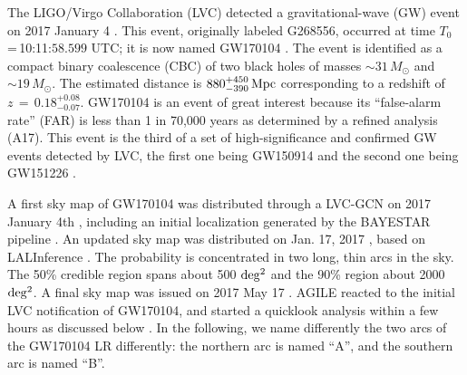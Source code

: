 \documentclass[preprint2]{aastex}
\def\gwt {G268556}
\def\gw {GW170104 }
\def\gwp {GW170104}
\def \fv {}
\begin{document}
The LIGO/Virgo Collaboration  (LVC) detected a
gravitational-wave (GW) event on  2017 January 4 \cite[][]{2017GCN..20364...1S,2017GCN..21056...1B,2017GCN..20385...1G}.
 This event, originally labeled \gwt, occurred at time
$T_0$\,=\,10:11:$58.599$ UTC; it is now named  \gw \cite[][ hereafter A17]{2017PhRvLsub}.
The event is identified
as a compact binary coalescence (CBC) of two black holes of masses
$ \sim 31 \, M_{\odot}$ and $\sim 19 \, M_{\odot}$. The estimated
distance is $880^{+450}_{-390}\, \rm Mpc$ corresponding to a redshift
of $z\,=\,0.18^{+0.08}_{-0.07}$.
%
\gw is an event of great interest because  its ``false-alarm rate''
(FAR) is less than 1 in 70,000 years as determined by a refined
analysis (A17). %
%
This event is the third of a set of high-significance and confirmed GW events detected by
LVC, the first one being GW150914 and the second one being GW151226 \cite[][]{2016PhRvD..93l2003A,2016PhRvL.116m1103A,2016PhRvL.116x1103A,2016PhRvL.116f1102A,2016PhRvD..93l2004A,2016PhRvL.116x1102A}.

 A first sky map of \gw was distributed through a LVC-GCN on 2017 January 4th \cite[][]{2017GCN..20364...1S},
including an initial localization generated by the BAYESTAR pipeline \cite[][]{2016PhRvD..93b4013S}.
An updated sky map was distributed on Jan. 17, 2017 \cite[][]{2017GCN..20385...1G},
based on LALInference \cite[][]{2015PhRvD..91d2003V}.
 The probability is concentrated in two long, thin arcs in the sky.
The 50\% credible region spans about 500 $\rm deg^2$ and the 90\% region about 2000 $\rm deg^2$.
A final sky map was issued on 2017 May 17 \cite[][]{2017GCN..21056...1B}.
%
 AGILE reacted to the initial LVC
notification of \gwp, and started a quicklook analysis within a few hours
as {\fv discuss}ed below \cite[][]{2017GCN..20375...1T,2017GCN..20395...1T}.
%
In the following, we
name differently the two arcs of the \gw LR differently: the northern arc is
named ``A'', and the southern arc is named ``B''.
\end{document}
